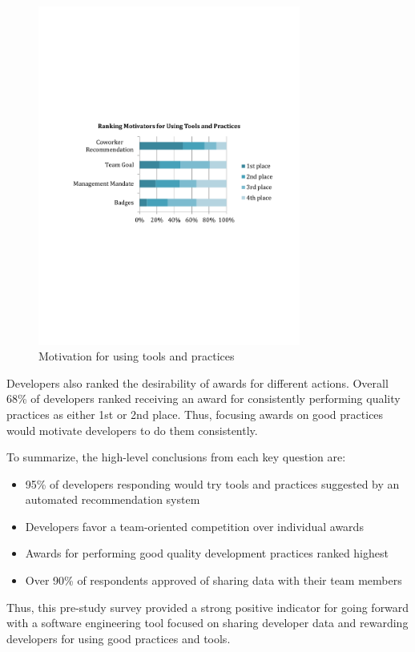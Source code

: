 \documentclass{sig-alternate}
\begin{document}
\begin{figure}
	\includegraphics[width=3.4in]{ToolAndPracticeMotivators.pdf}
	\caption{Motivation for using tools and practices}
	\label{fig:toolandpracticemotivators}
\end{figure}

Developers also ranked the desirability of awards for different actions.  Overall 68\% of developers ranked receiving an award for consistently performing quality practices as either 1st or 2nd place.  Thus, focusing awards on good practices would motivate developers to do them consistently.

 To summarize, the high-level conclusions from each key question are:
\begin{itemize}[itemsep=0mm]
\item 95\% of developers responding would try tools and practices suggested by an automated recommendation system 
\item Developers favor a team-oriented competition over individual awards
\item Awards for performing good quality development practices ranked highest
\item Over 90\% of respondents approved of sharing data with their team members
\end{itemize}
Thus, this pre-study survey provided a strong positive indicator for going forward with a software engineering tool focused on sharing developer data and rewarding developers for using good practices and tools. 
\end{document}
